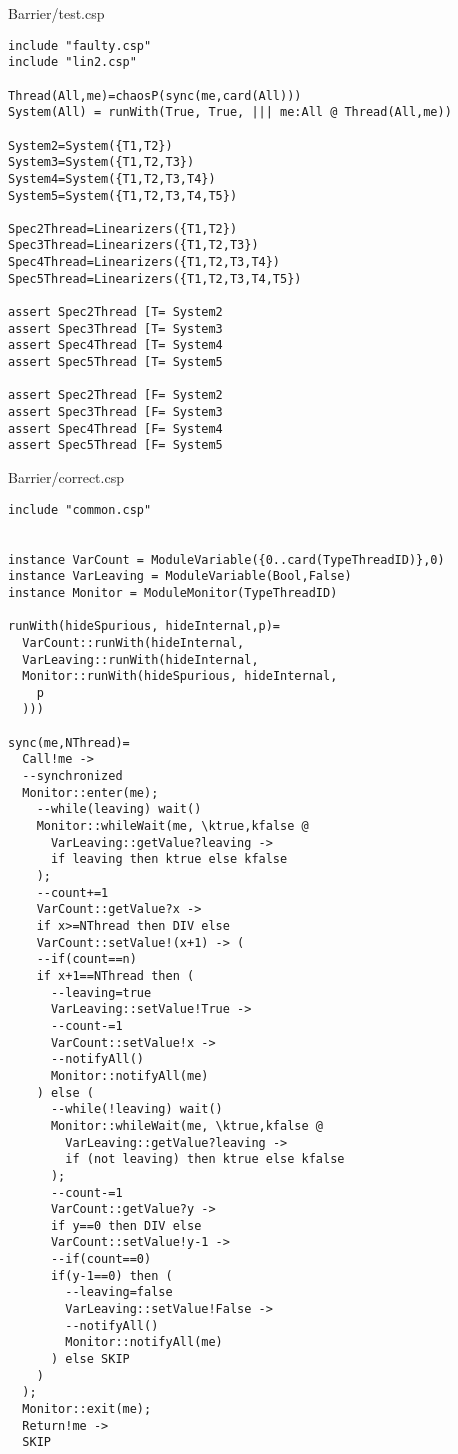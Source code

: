 Barrier/test.csp
\begin{lstlisting}
include "faulty.csp"
include "lin2.csp"

Thread(All,me)=chaosP(sync(me,card(All)))
System(All) = runWith(True, True, ||| me:All @ Thread(All,me))

System2=System({T1,T2})
System3=System({T1,T2,T3})
System4=System({T1,T2,T3,T4})
System5=System({T1,T2,T3,T4,T5})

Spec2Thread=Linearizers({T1,T2})
Spec3Thread=Linearizers({T1,T2,T3})
Spec4Thread=Linearizers({T1,T2,T3,T4})
Spec5Thread=Linearizers({T1,T2,T3,T4,T5})

assert Spec2Thread [T= System2
assert Spec3Thread [T= System3
assert Spec4Thread [T= System4
assert Spec5Thread [T= System5

assert Spec2Thread [F= System2
assert Spec3Thread [F= System3
assert Spec4Thread [F= System4
assert Spec5Thread [F= System5

\end{lstlisting}
Barrier/correct.csp
\begin{lstlisting}
include "common.csp"


instance VarCount = ModuleVariable({0..card(TypeThreadID)},0)
instance VarLeaving = ModuleVariable(Bool,False)
instance Monitor = ModuleMonitor(TypeThreadID)

runWith(hideSpurious, hideInternal,p)=
  VarCount::runWith(hideInternal,
  VarLeaving::runWith(hideInternal,
  Monitor::runWith(hideSpurious, hideInternal,
    p
  )))

sync(me,NThread)=
  Call!me ->
  --synchronized
  Monitor::enter(me);
    --while(leaving) wait()
    Monitor::whileWait(me, \ktrue,kfalse @
      VarLeaving::getValue?leaving ->
      if leaving then ktrue else kfalse
    );
    --count+=1
    VarCount::getValue?x ->
    if x>=NThread then DIV else
    VarCount::setValue!(x+1) -> (
    --if(count==n)
    if x+1==NThread then (
      --leaving=true
      VarLeaving::setValue!True ->
      --count-=1
      VarCount::setValue!x ->
      --notifyAll()
      Monitor::notifyAll(me)
    ) else (
      --while(!leaving) wait()
      Monitor::whileWait(me, \ktrue,kfalse @
        VarLeaving::getValue?leaving ->
        if (not leaving) then ktrue else kfalse
      );
      --count-=1
      VarCount::getValue?y -> 
      if y==0 then DIV else
      VarCount::setValue!y-1 ->
      --if(count==0)
      if(y-1==0) then (
        --leaving=false
        VarLeaving::setValue!False ->
        --notifyAll()
        Monitor::notifyAll(me)
      ) else SKIP
    )
  );
  Monitor::exit(me);
  Return!me ->
  SKIP




\end{lstlisting}
